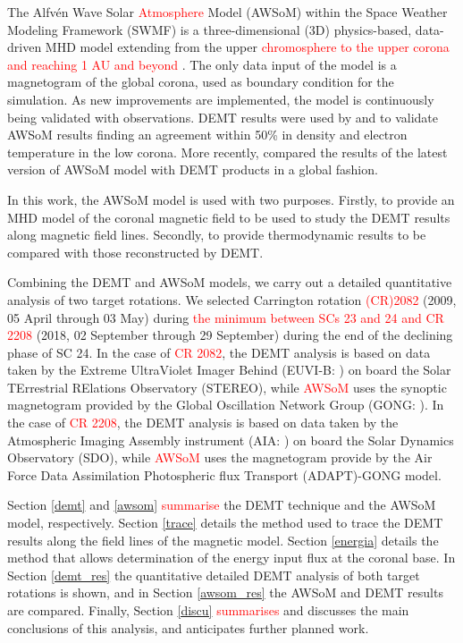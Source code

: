 \documentclass[namedreferences]{solarphysics}
\def\edit#1{\textcolor{Red}{#1}}
\begin{document}
\begin{article}
The Alfv\'{e}n Wave Solar \edit{Atmosphere} Model (AWSoM) within the Space Wea\-ther Modeling Framework (SWMF) is a three-dimensional (3D) physics-based, data-driven MHD model extending from the upper \edit{chromosphere to the upper corona and reaching {1 AU and beyond}} \citep{vander_2010, Van2014}. {The only data input of the model is a magnetogram of the global corona, used as boundary condition for the simulation. As new improvements are implemented, the model is continuously being validated with observations.} DEMT results were used by \citet{jin_2012} and \citet{oran_2015} to validate AWSoM results finding an agreement within 50\% in density and electron temperature in the low corona. More recently, \citet{sachdeva_2019} compared the results of the latest version of AWSoM model with DEMT products in a global fashion. 

{In this work, the AWSoM model is used with two purposes. Firstly, to provide an MHD model of the coronal magnetic field to be used to study the DEMT results along magnetic field lines. Secondly, to provide thermodynamic results to be compared with those reconstructed by DEMT.}

{Combining the DEMT and AWSoM models, we carry out a detailed {quantitative} analysis of two target rotations. We selected Carrington rotation} \edit{(CR)2082} (2009, 05 April through 03 May) during \edit{the minimum between SCs 23 and 24 and CR 2208} (2018, 02 September through 29 September) during {the end of the declining} phase of SC 24. {In the case of \edit{CR 2082}, the DEMT analysis is based on data} taken by the {Extreme UltraViolet Imager Behind} {(EUVI-B: \citealt{wuelser_2004})} on board the {Solar TErrestrial RElations Observatory} {(STEREO), while \edit{AWSoM} uses the synoptic magnetogram provided by the Global Oscillation Network Group (GONG: \citealt{gong}). In the case of \edit{CR 2208}, the DEMT analysis is based {on} data taken} by the {Atmospheric Imaging Assembly instrument} {(AIA: \citealt{lemen_2012})} on board the {Solar Dynamics Observatory} {(SDO), while \edit{AWSoM} uses the magnetogram provide by the Air Force Data Assimilation Photospheric flux Transport (ADAPT)-GONG model.}

Section \ref{demt} and \ref{awsom} {\edit{summarise} the DEMT technique and the AWSoM model, respectively.} Section \ref{trace} {details} the method used to trace {the DEMT} results along the field lines of the magnetic model. Section \ref{energia} details {the method that allows determination of the energy input flux at the coronal base.} In Section \ref{demt_res} the quantitative {detailed DEMT analysis of both target rotations is shown,} and in Section \ref{awsom_res} the AWSoM and DEMT results are compared. {Finally, Section} \ref{discu} \edit{summarises} and discusses the main conclusions of this analysis, and anticipates further planned work. 


\end{article}
\end{document}
